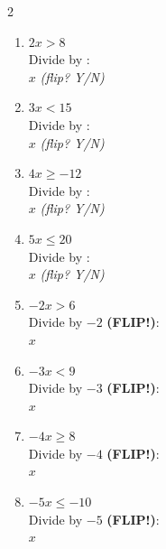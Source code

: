 \documentclass[12pt]{article}
\newcommand{\wsp}{\vspace{2.4cm}}
\newcommand{\sblank}{\underline{\hspace{1.4cm}}}
\begin{document}
\begin{multicols}{2}
\begin{enumerate}[label=\textbf{\arabic*.}, itemsep=0pt]

  \item $2x > 8$\\[3pt]
  Divide by \sblank:\\[3pt]
  $x$ \underline{\hspace{0.4cm}} \sblank \quad \textit{(flip? Y/N)}
  \wsp

  \item $3x < 15$\\[3pt]
  Divide by \sblank:\\[3pt]
  $x$ \underline{\hspace{0.4cm}} \sblank \quad \textit{(flip? Y/N)}
  \wsp

  \item $4x \geq -12$\\[3pt]
  Divide by \sblank:\\[3pt]
  $x$ \underline{\hspace{0.4cm}} \sblank \quad \textit{(flip? Y/N)}
  \wsp

  \item $5x \leq 20$\\[3pt]
  Divide by \sblank:\\[3pt]
  $x$ \underline{\hspace{0.4cm}} \sblank \quad \textit{(flip? Y/N)}
  \wsp

  \item $-2x > 6$\\[3pt]
  Divide by $-2$ \textbf{(FLIP!)}:\\[3pt]
  $x$ \underline{\hspace{0.4cm}} \sblank
  \wsp

  \item $-3x < 9$\\[3pt]
  Divide by $-3$ \textbf{(FLIP!)}:\\[3pt]
  $x$ \underline{\hspace{0.4cm}} \sblank
  \wsp

  \item $-4x \geq 8$\\[3pt]
  Divide by $-4$ \textbf{(FLIP!)}:\\[3pt]
  $x$ \underline{\hspace{0.4cm}} \sblank
  \wsp

  \item $-5x \leq -10$\\[3pt]
  Divide by $-5$ \textbf{(FLIP!)}:\\[3pt]
  $x$ \underline{\hspace{0.4cm}} \sblank
  \wsp

\end{enumerate}
\end{multicols}
\end{document}
